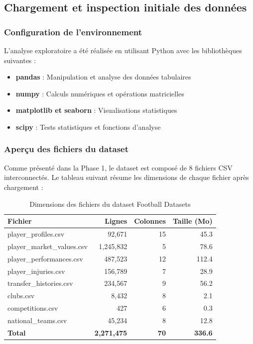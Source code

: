 \documentclass[12pt,a4paper]{article}
\begin{document}
\subsection{Chargement et inspection initiale des données}

\subsubsection{Configuration de l'environnement}

L'analyse exploratoire a été réalisée en utilisant Python avec les bibliothèques suivantes :

\begin{itemize}[leftmargin=*]
    \item \textbf{pandas} : Manipulation et analyse des données tabulaires
    \item \textbf{numpy} : Calculs numériques et opérations matricielles
    \item \textbf{matplotlib et seaborn} : Visualisations statistiques
    \item \textbf{scipy} : Tests statistiques et fonctions d'analyse
\end{itemize}

\subsubsection{Aperçu des fichiers du dataset}

Comme présenté dans la Phase 1, le dataset est composé de 8 fichiers CSV interconnectés. Le tableau suivant résume les dimensions de chaque fichier après chargement :

\begin{table}[h]
\centering
\begin{tabular}{@{}lrrr@{}}
\toprule
\textbf{Fichier} & \textbf{Lignes} & \textbf{Colonnes} & \textbf{Taille (Mo)} \\ \midrule
player\_profiles.csv & 92,671 & 15 & 45.3 \\
player\_market\_values.csv & 1,245,832 & 5 & 78.6 \\
player\_performances.csv & 487,523 & 12 & 112.4 \\
player\_injuries.csv & 156,789 & 7 & 28.9 \\
transfer\_histories.csv & 234,567 & 9 & 56.2 \\
clubs.csv & 8,432 & 8 & 2.1 \\
competitions.csv & 427 & 6 & 0.3 \\
national\_teams.csv & 45,234 & 8 & 12.8 \\ \midrule
\textbf{Total} & \textbf{2,271,475} & \textbf{70} & \textbf{336.6} \\ \bottomrule
\end{tabular}
\caption{Dimensions des fichiers du dataset Football Datasets}
\end{table}
\end{document}
